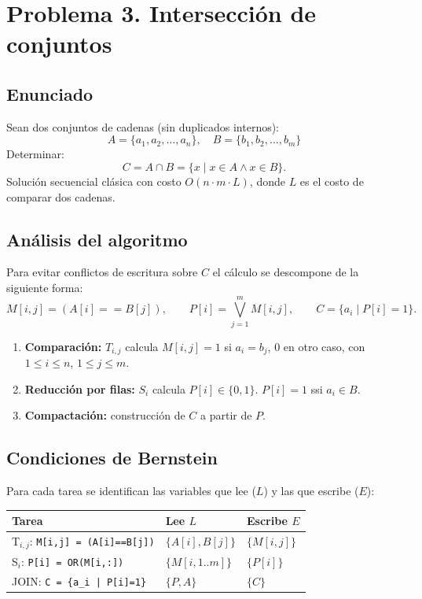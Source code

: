 \section{Problema 3. Intersecci\'on de conjuntos}

\subsection*{Enunciado}
Sean dos conjuntos de cadenas (sin duplicados internos):
\[
  A = \{a_1,a_2,\dots,a_n\}, \quad B = \{b_1,b_2,\dots,b_m\}
\]
Determinar:
\[
  C = A \cap B = \{x \mid x \in A \land x \in B\}.
\]
Soluci\'on secuencial cl\'asica con costo $O(n \cdot m \cdot L)$, donde $L$ es el costo de comparar dos cadenas.

\subsection*{An\'alisis del algoritmo}
Para evitar conflictos de escritura sobre $C$ el c\'alculo se descompone de la siguiente forma:
\[
  M[i,j] = (A[i]==B[j]), \qquad
  P[i] = \bigvee_{j=1}^{m} M[i,j], \qquad
  C = \{a_i \mid P[i]=1\}.
\]
\begin{enumerate}[leftmargin=1.4cm]
  \item \textbf{Comparaci\'on:} $T_{i,j}$ calcula $M[i,j]=1$ si $a_i=b_j$, $0$ en otro caso, con $1 \le i \le n$, $1 \le j \le m$.
  \item \textbf{Reducci\'on por filas:} $S_i$ calcula $P[i] \in \{0,1\}$. $P[i]=1$ ssi $a_i \in B$.
  \item \textbf{Compactaci\'on:} construcci\'on de $C$ a partir de $P$.
\end{enumerate}

\subsection*{Condiciones de Bernstein}
Para cada tarea se identifican las variables que lee ($L$) y las que escribe ($E$):

\begin{center}
\begin{tabular}{lll}
\toprule
Tarea & Lee $L$ & Escribe $E$ \\
\midrule
T$_{i,j}$: \texttt{M[i,j] = (A[i]==B[j])} & $\{A[i],B[j]\}$ & $\{M[i,j]\}$ \\
S$_{i}$: \texttt{P[i] = OR(M[i,:])} & $\{M[i,1..m]\}$ & $\{P[i]\}$ \\
JOIN: \texttt{C = \{a\_i | P[i]=1\}} & $\{P,A\}$ & $\{C\}$ \\
\bottomrule
\end{tabular}
\end{center}

